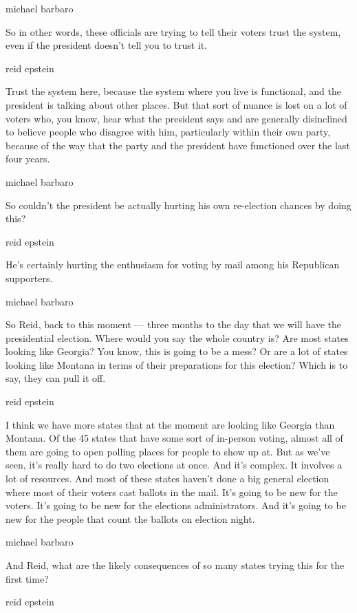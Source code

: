 michael barbaro

So in other words, these officials are trying to tell their voters trust
the system, even if the president doesn't tell you to trust it.

reid epstein

Trust the system here, because the system where you live is functional,
and the president is talking about other places. But that sort of nuance
is lost on a lot of voters who, you know, hear what the president says
and are generally disinclined to believe people who disagree with him,
particularly within their own party, because of the way that the party
and the president have functioned over the last four years.

michael barbaro

So couldn't the president be actually hurting his own re-election
chances by doing this?

reid epstein

He's certainly hurting the enthusiasm for voting by mail among his
Republican supporters.

michael barbaro

So Reid, back to this moment --- three months to the day that we will
have the presidential election. Where would you say the whole country
is? Are most states looking like Georgia? You know, this is going to be
a mess? Or are a lot of states looking like Montana in terms of their
preparations for this election? Which is to say, they can pull it off.

reid epstein

I think we have more states that at the moment are looking like Georgia
than Montana. Of the 45 states that have some sort of in-person voting,
almost all of them are going to open polling places for people to show
up at. But as we've seen, it's really hard to do two elections at once.
And it's complex. It involves a lot of resources. And most of these
states haven't done a big general election where most of their voters
cast ballots in the mail. It's going to be new for the voters. It's
going to be new for the elections administrators. And it's going to be
new for the people that count the ballots on election night.

michael barbaro

And Reid, what are the likely consequences of so many states trying this
for the first time?

reid epstein

